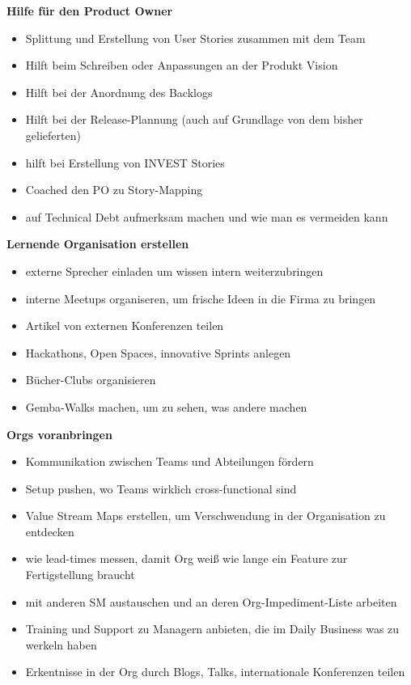 \textbf{Hilfe für den Product Owner}

\begin{itemize}
  \item Splittung und Erstellung von User Stories zusammen mit dem Team
  \item Hilft beim Schreiben oder Anpassungen an der Produkt Vision
  \item Hilft bei der Anordnung des Backlogs
  \item Hilft bei der Release-Plannung (auch auf Grundlage von dem bisher gelieferten)
  \item hilft bei Erstellung von INVEST Stories
  \item Coached den PO zu Story-Mapping
  \item auf Technical Debt aufmerksam machen und wie man es vermeiden kann
\end{itemize}


\textbf{Lernende Organisation erstellen}


\begin{itemize}
  \item externe Sprecher einladen um wissen intern weiterzubringen
  \item interne Meetups organiseren, um frische Ideen in die Firma zu bringen
  \item Artikel von externen Konferenzen teilen
  \item Hackathons, Open Spaces, innovative Sprints anlegen
  \item Bücher-Clubs organisieren
  \item Gemba-Walks machen, um zu sehen, was andere machen
\end{itemize}


\textbf{Orgs voranbringen}

\begin{itemize}
  \item Kommunikation zwischen Teams und Abteilungen fördern
  \item Setup pushen, wo Teams wirklich cross-functional sind
  \item Value Stream Maps erstellen, um Verschwendung in der Organisation zu entdecken
  \item wie lead-times messen, damit Org weiß wie lange ein Feature zur Fertigstellung braucht
  \item mit anderen SM austauschen und an deren Org-Impediment-Liste arbeiten
  \item Training und Support zu Managern anbieten, die im Daily Business was zu werkeln haben
  \item Erkentnisse in der Org durch Blogs, Talks, internationale Konferenzen teilen
\end{itemize}

